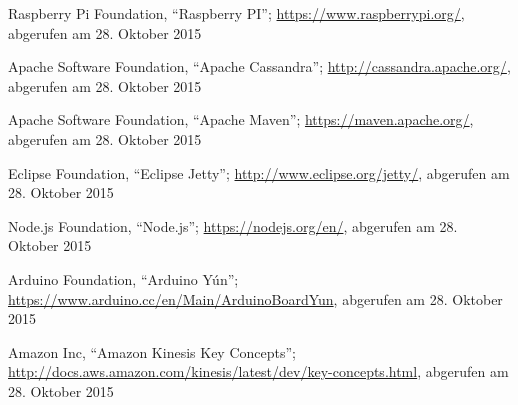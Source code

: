 \begin{thebibliography}{1}
Raspberry Pi Foundation, ``Raspberry PI''; \url{https://www.raspberrypi.org/}, abgerufen am 28. Oktober 2015

Apache Software Foundation, ``Apache Cassandra''; \url{http://cassandra.apache.org/}, abgerufen am 28. Oktober 2015

Apache Software Foundation, ``Apache Maven''; \url{https://maven.apache.org/}, abgerufen am 28. Oktober 2015

Eclipse Foundation, ``Eclipse Jetty''; \url{http://www.eclipse.org/jetty/}, abgerufen am 28. Oktober 2015

Node.js Foundation, ``Node.js''; \url{https://nodejs.org/en/}, abgerufen am 28. Oktober 2015

Arduino Foundation, ``Arduino Yún''; \url{https://www.arduino.cc/en/Main/ArduinoBoardYun}, abgerufen am 28. Oktober 2015

Amazon Inc, ``Amazon Kinesis Key Concepts'';  \url{http://docs.aws.amazon.com/kinesis/latest/dev/key-concepts.html}, abgerufen am 28. Oktober 2015

\end{thebibliography}